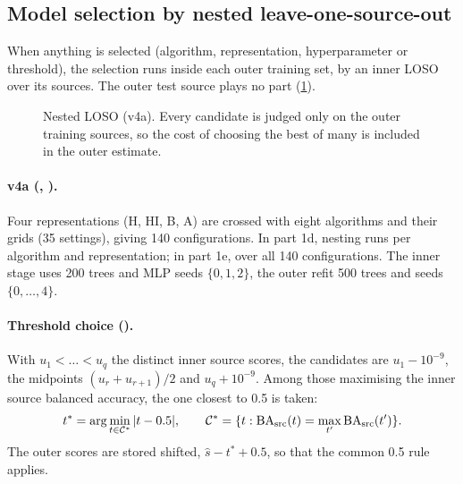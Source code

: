 \subsection{Model selection by nested leave-one-source-out}\label{sec:nested}
When anything is selected (algorithm, representation, hyperparameter or threshold), the selection runs inside each outer
training set, by an inner LOSO over its sources. The outer test source plays no part (\cref{fig:nested}).

\begin{figure}[htbp]
\centering
{}
\caption{Nested LOSO (v4a). Every candidate is judged only on the outer training sources, so the cost of choosing the best
of many is included in the outer estimate.}\label{fig:nested}
\end{figure}

\paragraph{v4a (, ).} Four representations (H, HI, B, A) are crossed with
eight algorithms and their grids (35 settings), giving 140 configurations. In part 1d, nesting runs per algorithm and
representation; in part 1e, over all 140 configurations. The inner stage uses 200 trees and MLP seeds $\{0,1,2\}$, the outer
refit 500 trees and seeds $\{0,\dots,4\}$.

\paragraph{Threshold choice ().} With $u_1<\dots<u_q$ the distinct inner source scores, the
candidates are $u_1-10^{-9}$, the midpoints $(u_r+u_{r+1})/2$ and $u_q+10^{-9}$. Among those maximising the inner source
balanced accuracy, the one closest to 0.5 is taken:
\begin{equation}
t^\ast=\arg\min_{t\in\mathcal C^\ast}|t-0.5|,\qquad\mathcal C^\ast=\{t:\mathrm{BA}_\mathrm{src}(t)=\max_{t'}\mathrm{BA}_\mathrm{src}(t')\}.\label{eq:choosethreshold}
\end{equation}
The outer scores are stored shifted, $\hat s-t^\ast+0.5$, so that the common 0.5 rule applies.

